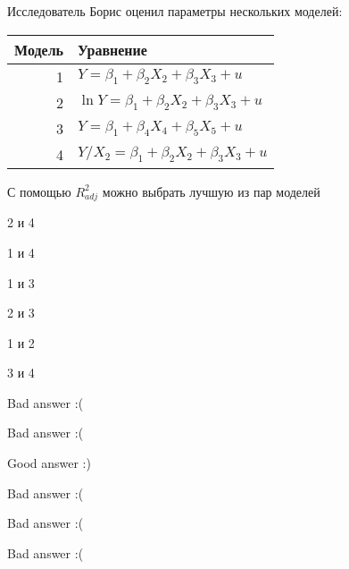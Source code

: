 
\begin{question}
Исследователь Борис оценил параметры нескольких моделей:

\begin{tabular}{rl}
\toprule
Модель & Уравнение \\
\midrule
1 &  $Y = \beta_1 + \beta_2 X_2 + \beta_3 X_3 + u$ \\
2 &  $\ln Y = \beta_1 + \beta_2 X_2 + \beta_3 X_3 + u$ \\
3 &  $Y = \beta_1 + \beta_4 X_4 + \beta_5 X_5 + u$ \\
4 &  $Y/X_2 = \beta_1 + \beta_2 X_2 + \beta_3 X_3 + u$ \\
\bottomrule
\end{tabular}

С помощью \(R^2_{adj}\) можно выбрать лучшую из пар моделей
\begin{answerlist}
  \item 2 и 4
  \item 1 и 4
  \item 1 и 3
  \item 2 и 3
  \item 1 и 2
  \item 3 и 4
\end{answerlist}
\end{question}

\begin{solution}
\begin{answerlist}
  \item Bad answer :(
  \item Bad answer :(
  \item Good answer :)
  \item Bad answer :(
  \item Bad answer :(
  \item Bad answer :(
\end{answerlist}
\end{solution}

